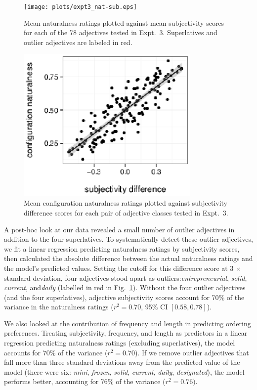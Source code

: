 \documentclass[12pt]{article}
\begin{document}
\begin{figure}
	\centering\texttt{[image: plots/expt3\_nat-sub.eps]}
	\caption{Mean naturalness ratings plotted against mean subjectivity scores for each of the 78 adjectives tested in Expt.~3. Superlatives and outlier adjectives are labeled in red.}\label{fig:exp3-nat-subj}
\end{figure}

\begin{figure}
	\centering\includegraphics[width=3.5in]{plots/naturalness-subjectivity_class-difference_no-sup.eps}
	\caption{Mean configuration naturalness ratings plotted against subjectivity difference scores for each pair of adjective classes tested in Expt.~3.}\label{fig:exp3-nat-subj-diff}
\end{figure}

A post-hoc look at our data revealed a small number of outlier adjectives in addition to the four superlatives. To systematically detect these outlier adjectives, we fit a linear regression predicting naturalness ratings by subjectivity scores, then calculated the absolute difference between the actual naturalness ratings and the model's predicted values. Setting the cutoff for this difference score at 3 $\times$ standard deviation, four adjectives stood apart as outliers: ​\emph{entrepreneurial}​, ​\emph{solid}​, ​\emph{current}​, and ​\emph{daily} (labelled in red in Fig.~\ref{fig:exp3-nat-subj}). Without the four outlier adjectives (and the four superlatives), adjective subjectivity scores account for 70\% of the variance in the naturalness ratings ($r^2=0.70$, 95\% CI $[0.58,  0.78]$).

We also looked at the contribution of frequency and length in predicting ordering preferences. Treating subjectivity, frequency, and length as predictors in a linear regression predicting naturalness ratings (excluding superlatives), the model accounts for 70\% of the variance ($r^{2}=0.70$). If we remove outlier adjectives that fall more than three standard deviations away from the predicted value of the model (there were six: \emph{mini}, \emph{frozen}, \emph{solid}, \emph{current}, \emph{daily}, \emph{designated}), the model performs better, accounting for 76\% of the variance ($r^{2}=0.76)$.
\end{document}
